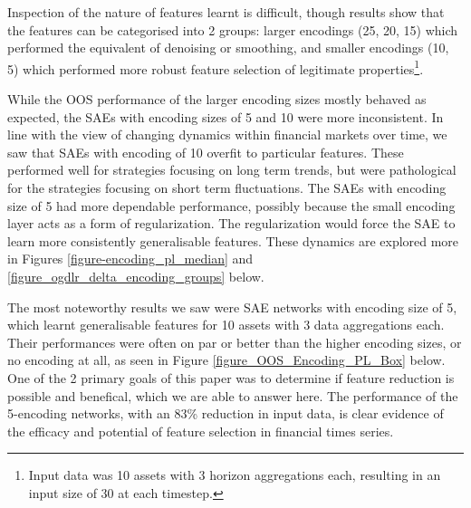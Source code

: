 \documentclass[a4paper,11pt,oneside]{article}
\theoremstyle{plain}
\theoremstyle{definition}
\begin{document}
	Inspection of the nature of features learnt is difficult, though results show that the features can be categorised into 2 groups: larger encodings (25, 20, 15) which performed the equivalent of denoising or smoothing, and smaller encodings (10, 5) which performed more robust feature selection of legitimate properties\footnote{Input data was 10 assets with 3 horizon aggregations each, resulting in an input size of 30 at each timestep.}.\newline

	While the OOS performance of the larger encoding sizes mostly behaved as expected, the SAEs with encoding sizes of 5 and 10 were more inconsistent. In line with the view of changing dynamics within financial markets over time, we saw that SAEs with encoding of 10 overfit to particular features. These performed well for strategies focusing on long term trends, but were pathological for the strategies focusing on short term fluctuations. The SAEs with encoding size of 5 had more dependable performance, possibly because the small encoding layer acts as a form of regularization. The regularization would force the SAE to learn more consistently generalisable features. These dynamics are explored more in Figures \ref{figure-encoding_pl_median} and \ref{figure_ogdlr_delta_encoding_groups} below.  \newline
	
	The most noteworthy results we saw were SAE networks with encoding size of 5, which learnt generalisable features for 10 assets with 3 data aggregations each. Their performances were often on par or better than the higher encoding sizes, or no encoding at all, as seen in Figure \ref{figure_OOS_Encoding_PL_Box} below. One of the 2 primary goals of this paper was to determine if feature reduction is possible and benefical, which we are able to answer here. The performance of the 5-encoding networks, with an 83\% reduction in input data, is clear evidence of the efficacy and potential of feature selection in financial times series.  \newline
	
\end{document}
